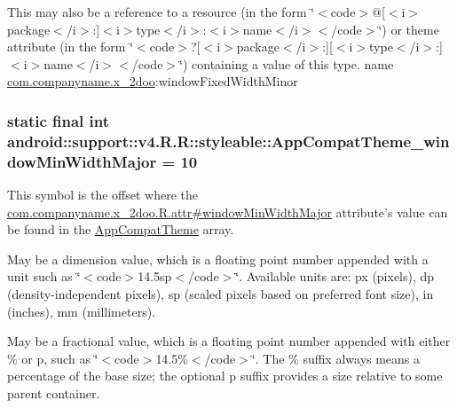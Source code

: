This may also be a reference to a resource (in the form \char`\"{}$<$code$>$@\mbox{[}$<$i$>$package$<$/i$>$:\mbox{]}$<$i$>$type$<$/i$>$:$<$i$>$name$<$/i$>$$<$/code$>$\char`\"{}) or theme attribute (in the form \char`\"{}$<$code$>$?\mbox{[}$<$i$>$package$<$/i$>$:\mbox{]}\mbox{[}$<$i$>$type$<$/i$>$:\mbox{]}$<$i$>$name$<$/i$>$$<$/code$>$\char`\"{}) containing a value of this type.  name \hyperlink{namespacecom_1_1companyname_1_1x__2doo}{com.companyname.x\_\-2doo}:windowFixedWidthMinor \hypertarget{classandroid_1_1support_1_1v4_1_1_r_1_1styleable_73b62d7534ce501813e6dcf984016df4}{
\subsubsection[{AppCompatTheme\_\-windowMinWidthMajor}]{\setlength{\rightskip}{0pt plus 5cm}static final int android::support::v4.R.R::styleable::AppCompatTheme\_\-windowMinWidthMajor = 10}}
\label{classandroid_1_1support_1_1v4_1_1_r_1_1styleable_73b62d7534ce501813e6dcf984016df4}


This symbol is the offset where the \hyperlink{classcom_1_1companyname_1_1x__2doo_1_1_r_1_1attr_7a57784c7bb33cd04c80f9c559ae7df0}{com.companyname.x\_\-2doo.R.attr\#windowMinWidthMajor} attribute's value can be found in the \hyperlink{classandroid_1_1support_1_1v4_1_1_r_1_1styleable_0873e92ba21076bb5a4aeadeb7f5779f}{AppCompatTheme} array.

May be a dimension value, which is a floating point number appended with a unit such as \char`\"{}$<$code$>$14.5sp$<$/code$>$\char`\"{}. Available units are: px (pixels), dp (density-independent pixels), sp (scaled pixels based on preferred font size), in (inches), mm (millimeters). 

May be a fractional value, which is a floating point number appended with either \% or p, such as \char`\"{}$<$code$>$14.5\%$<$/code$>$\char`\"{}. The \% suffix always means a percentage of the base size; the optional p suffix provides a size relative to some parent container. 

